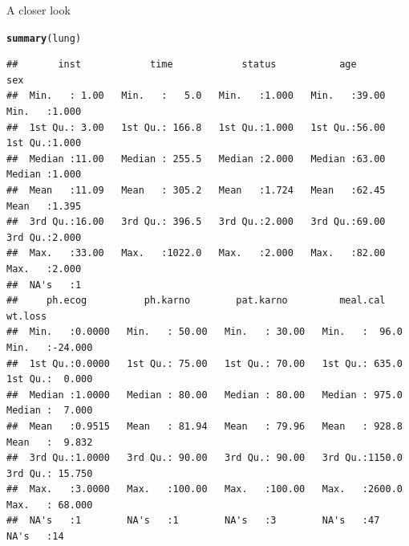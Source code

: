 \documentclass[unknownkeysallowed]{beamer}\usepackage[]{graphicx}\usepackage[]{color}
\makeatletter
\newcommand{\hlstd}[1]{\textcolor[rgb]{0.345,0.345,0.345}{#1}}%
\newcommand{\hlkwd}[1]{\textcolor[rgb]{0.737,0.353,0.396}{\textbf{#1}}}%
\newenvironment{kframe}{%
 \def\at@end@of@kframe{}%
 \ifinner\ifhmode%
  \def\at@end@of@kframe{\end{minipage}}%
  \begin{minipage}{\columnwidth}%
 \fi\fi%
 \def\FrameCommand##1{\hskip\@totalleftmargin \hskip-\fboxsep
 \colorbox{shadecolor}{##1}\hskip-\fboxsep
     \hskip-\linewidth \hskip-\@totalleftmargin \hskip\columnwidth}%
 \MakeFramed {\advance\hsize-\width
   \@totalleftmargin\z@ \linewidth\hsize
   \@setminipage}}%
 {\par\unskip\endMakeFramed%
 \at@end@of@kframe}
\newenvironment{knitrout}{}{} %
\makeatother
\begin{document}
\begin{frame}[fragile]{A closer look}


\begin{knitrout}\tiny
{}\color{fgcolor}\begin{kframe}
\begin{alltt}
\hlkwd{summary}\hlstd{(lung)}
\end{alltt}
\begin{verbatim}
##       inst            time            status           age             sex       
##  Min.   : 1.00   Min.   :   5.0   Min.   :1.000   Min.   :39.00   Min.   :1.000  
##  1st Qu.: 3.00   1st Qu.: 166.8   1st Qu.:1.000   1st Qu.:56.00   1st Qu.:1.000  
##  Median :11.00   Median : 255.5   Median :2.000   Median :63.00   Median :1.000  
##  Mean   :11.09   Mean   : 305.2   Mean   :1.724   Mean   :62.45   Mean   :1.395  
##  3rd Qu.:16.00   3rd Qu.: 396.5   3rd Qu.:2.000   3rd Qu.:69.00   3rd Qu.:2.000  
##  Max.   :33.00   Max.   :1022.0   Max.   :2.000   Max.   :82.00   Max.   :2.000  
##  NA's   :1                                                                       
##     ph.ecog          ph.karno        pat.karno         meal.cal         wt.loss       
##  Min.   :0.0000   Min.   : 50.00   Min.   : 30.00   Min.   :  96.0   Min.   :-24.000  
##  1st Qu.:0.0000   1st Qu.: 75.00   1st Qu.: 70.00   1st Qu.: 635.0   1st Qu.:  0.000  
##  Median :1.0000   Median : 80.00   Median : 80.00   Median : 975.0   Median :  7.000  
##  Mean   :0.9515   Mean   : 81.94   Mean   : 79.96   Mean   : 928.8   Mean   :  9.832  
##  3rd Qu.:1.0000   3rd Qu.: 90.00   3rd Qu.: 90.00   3rd Qu.:1150.0   3rd Qu.: 15.750  
##  Max.   :3.0000   Max.   :100.00   Max.   :100.00   Max.   :2600.0   Max.   : 68.000  
##  NA's   :1        NA's   :1        NA's   :3        NA's   :47       NA's   :14
\end{verbatim}
\end{kframe}
\end{knitrout}
  
\end{frame}
\end{document}
